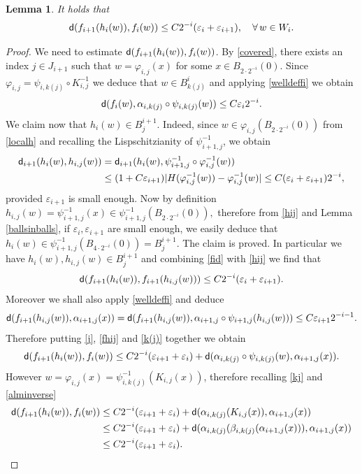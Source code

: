 \documentclass[11pt]{article}
\newcommand{\eps}{\varepsilon}
\newcommand{\sfd}{{\sf d}}
\renewcommand{\phi}{\varphi}
\theoremstyle{plain}
\newtheorem{lemma}[theorem]{Lemma}
\theoremstyle{definition}
\numberwithin{equation}{section}
\begin{document}
\begin{lemma}\label{point4}
	It holds that 
	$$\sfd(f_{i+1}(h_i(w)),f_i(w))\le C 2^{-i}(\eps_i+\eps_{i+1}), \quad \forall \, w \in W_i.$$ 
\end{lemma}
\begin{proof}
	
	We need to estimate $\sfd(f_{i+1}(h_i(w)),f_i(w))$. By \eqref{covered}, there exists an index $j \in J_{i+1}$ such that $w=\phi_{i,j}(x)$ for some  $ x \in B_{2\cdot 2^{-i}}(0).$ Since $\phi_{i,j}=\psi_{i,k(j)}\circ K_{i,j}^{-1}$ we deduce that $w \in B_{k(j)}^i$ and applying \eqref{welldeffi} we obtain
	\begin{equation}\label{k(j)}
		\sfd(f_i(w),\alpha_{i,k(j)}\circ \psi_{i,k(j)}(w))\le C\eps_i 2^{-i}.
	\end{equation}
	We claim now that $h_i(w)\in B_j^{i+1}$. Indeed, since $w \in \phi_{i,j}(B_{2 \cdot 2^{-i}}(0))$  from \eqref{localh} and recalling the Lispschitzianity of $\psi_{i+1,j}^{-1}$, we obtain 
	\begin{equation}\label{hij}
		\begin{split}
			\sfd_{i+1}(h_i(w),h_{i,j}(w))&=\sfd_{i+1}(h_i(w),\psi^{-1}_{i+1,j}\circ \phi_{i,j}^{-1}(w))\\
			&\le(1+C\eps_{i+1}) |H( \phi_{i,j}^{-1}(w))-\phi_{i,j}^{-1}(w)|\le  C(\eps_i+\eps_{i+1}) 2^{-i},
		\end{split}
	\end{equation}
	provided $\eps_{i+1}$ is small enough.
	Now  by  definition  $h_{i,j}(w)=\psi_{i+1,j}^{-1}(x)\in \psi_{i+1,j}^{-1}(B_{2 \cdot 2^{-i}}(0)),$ therefore from \eqref{hij} and Lemma \ref{ballsinballs}, if $\eps_i,\eps_{i+1}$ are small enough, we easily deduce that $h_i(w)\in \psi_{i+1,j}^{-1}(B_{4 \cdot 2^{-i}}(0))=B_j^{i+1}$. The claim is proved. In particular we have $h_i(w),h_{i,j}(w)\in B_j^{i+1}$ and combining \eqref{fid} with \eqref{hij} we find that 
	\begin{equation}\label{fhij}
		\sfd(f_{i+1}(h_i(w)),f_{i+1}(h_{i,j}(w)))\le C 2^{-i}(\eps_i+\eps_{i+1}).
	\end{equation}
	Moreover we shall also apply \eqref{welldeffi} and deduce
	\begin{equation}\label{j}
		\sfd(f_{i+1}(h_{i,j}(w)),\alpha_{i+1,j}(x))=\sfd(f_{i+1}(h_{i,j}(w)),\alpha_{i+1,j}\circ \psi_{i+1,j}(h_{i,j}(w)))\le C\eps_{i+1} 2^{-i-1}.
	\end{equation}
	Therefore putting \eqref{j}, \eqref{fhij} and \eqref{k(j)} together we obtain
	\[\sfd(f_{i+1}(h_i(w)),f_i(w))\le C2^{-i}(\eps_{i+1}  +\eps_i )+ \sfd(\alpha_{i,k(j)}\circ \psi_{i,k(j)}(w),\alpha_{i+1,j}(x)). \]
	However $w=\phi_{i,j}(x)=\psi_{i,k(j)}^{-1}(K_{i,j}(x))$, therefore recalling \eqref{kj}  and \eqref{alminverse}
	\begin{align*}
		\sfd(f_{i+1}(h_i(w)),f_i(w))&\le C2^{-i}(\eps_{i+1}  +\eps_i )+ \sfd(\alpha_{i,k(j)}(K_{i,j}(x)),\alpha_{i+1,j}(x))\\
		&\le C2^{-i}(\eps_{i+1}  +\eps_i )+ \sfd(\alpha_{i,k(j)}(\beta_{i,k(j)}(\alpha_{i+1,j}(x))),\alpha_{i+1,j}(x))\\
		&\le C2^{-i}(\eps_{i+1}  +\eps_i ).
	\end{align*}
\end{proof}
\end{document}
